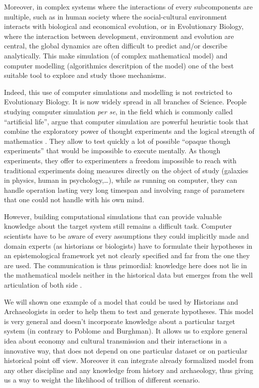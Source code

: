 \documentclass[a4paper]{article}
\begin{document}
Moreover, in complex systems where the interactions of every subcomponents are multiple, such as in human society where the social-cultural environment interacts with biological and economical evolution, or in Evolutionary Biology, where the interaction between development, environment and evolution are central, the global dynamics are often difficult to predict and/or describe analytically. This make simulation (of complex mathematical model) and computer modelling (algorithmics descritpion of the model) one of the best suitable tool to explore and study those mechanisms.

Indeed, this use of computer simulations and modelling is not restricted to Evolutionary Biology. It is now widely spread in all branches of Science. People studying computer simulation \emph{per se}, in the field which is commonly called ``artificial life''\cite{langton89alifeiproceedingsfirstinternationalworkshopsynthesissimulationlivingsystems}, argue that computer simulation are powerful heuristic tools that combine the exploratory power of thought experiments and the logical strength of mathematics \cite{paolo00simulationmodelsasopaquethoughtexperiments}.  They allow to test quickly a lot of possible ``opaque though experiments'' that would be impossible to execute mentally. As though experiments, they offer to experimenters a freedom impossible to reach with traditional experiments doing measures directly on the object of study (galaxies in physics, human in psychology,\ldots), while as running on computer, they can handle operation lasting very long timespan and involving range of parameters that one could not handle with his own mind.

However, building computational simulations that can provide valuable knowledge about the target system still remains a difficult task. Computer scientists have to be aware of every assumptions they could implicitly made and domain experts (as historians or biologists) have to formulate their hypotheses in an epistemological framework yet not clearly specified and far from the one they are used. The communication is thus primordial: knowledge here does not lie in the mathematical models neither in the historical data but emerges from the well articulation of both side \cite{winsberg09taletwomethods}.

We will shown  one example of a model that could be used by Historians and Archaeologists in order to help them to test and generate hypotheses. This model is very general  and doesn't incorporate  knowledge about a particular target system (in contrary to Poblome and Burghman). It allows us to explore general idea about economy and cultural transmission and their interactions in a innovative way, that does not depend on one particular dataset or on particular historical point off view. Moreover it can integrate already formalized model from any other discipline and any knowledge from history and archaeology, thus giving us a way to weight the likelihood of trillion of different scenario.
\end{document}
